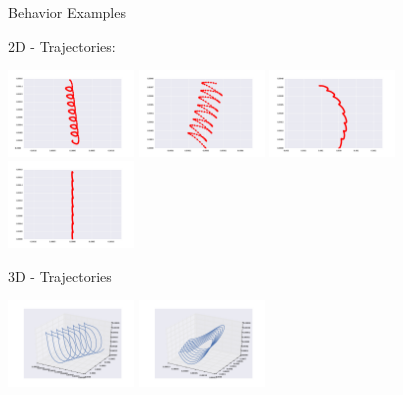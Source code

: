 \documentclass{beamer}
\begin{document}
\begin{frame}[allowframebreaks]{Behavior Examples}

\begin{minipage}{\textwidth}
\begin{block}{2D - Trajectories:}
\begin{center}
\includegraphics[width=0.25\textwidth]{../Figures/Behaviors/00.pdf}
\includegraphics[width=0.25\textwidth]{../Figures/Behaviors/01.pdf}
\includegraphics[width=0.25\textwidth]{../Figures/Behaviors/02.pdf}
\includegraphics[width=0.25\textwidth]{../Figures/Behaviors/03.pdf}
\end{center}
\end{block}
\begin{block}{3D - Trajectories}
\begin{center}
\includegraphics[width=0.25\textwidth]{../Figures/Behaviors/10.pdf}
\includegraphics[width=0.25\textwidth]{../Figures/Behaviors/11.pdf}

\end{center}
\end{block}
\end{minipage}
\end{frame}
\end{document}
